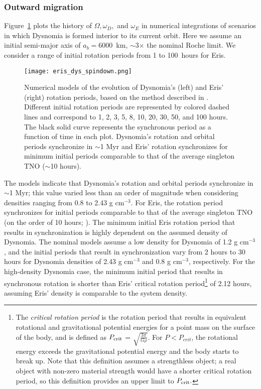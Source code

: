 \documentclass[onecolumn]{aastex631}
\begin{document}
\subsubsection{Outward migration}
Figure~\ref{eris_dys_num_model} plots the history of $\Omega, \omega_D,$ and $\omega_E$ in numerical integrations of scenarios in which Dysnomia is formed interior to its current orbit.  Here we assume an initial semi-major axis of $a_b=6000$~km, $\sim$3$\times$ the nominal Roche limit. We consider a range of initial rotation periods from 1 to 100~hours for Eris.
\begin{figure}[ht!]
\begin{center}
\texttt{[image: eris\_dys\_spindown.png]}
\caption{Numerical models of the evolution of Dysnomia's (left) and Eris' (right) rotation periods, based on the method described in \citep{Hastings16}. Different initial rotation periods are represented by colored dashed lines and correspond to 1, 2, 3, 5, 8, 10, 20, 30, 50, and 100 hours. The black solid curve represents the synchronous period as a function of time in each plot.
Dysnomia's rotation and orbital periods synchronize in $\sim$1 Myr and Eris' rotation synchronizes for minimum initial periods comparable to that of the average singleton TNO ($\sim$10 hours). \label{eris_dys_num_model}}
\end{center}
\end{figure}
The models indicate that Dysnomia's rotation and orbital periods synchronize in $\sim$1 Myr; this value varied less than an order of magnitude when considering densities ranging from 0.8 to 2.43 g cm$^{-3}$. For Eris, the rotation period synchronizes for initial periods comparable to that of the average singleton TNO (on the order of 10 hours; \citealt{LacLuu06,Thirouin14}). The minimum initial Eris rotation period that results in synchronization is highly dependent on the assumed density of Dysnomia. The nominal models assume a low density for Dysnomia of 1.2 g cm$^{-3}$, and the initial periods that result in synchronization vary from 2 hours to 30 hours for Dysnomia densities of 2.43 g cm$^{-3}$ and 0.8 g cm$^{-3}$, respectively. For the high-density Dysnomia case, the minimum initial period that results in synchronous rotation is shorter than Eris' critical rotation period\footnote{The {\it critical rotation period} is the rotation period that results in equivalent rotational and gravitational potential energies for a point mass on the surface of the body, and is defined as $P_{\rm crit}$ = $\sqrt{\frac{3\pi}{G\rho}}$. For $P<P_{crit}$, the rotational energy exceeds the gravitational potential energy and the body starts to break up. Note that this definition assumes a strengthless object; a real object with non-zero material strength would have a shorter critical rotation period, so this definition provides an upper limit to $P_{\rm crit}.$} of 2.12 hours, assuming Eris' density is comparable to the system density.
\end{document}
